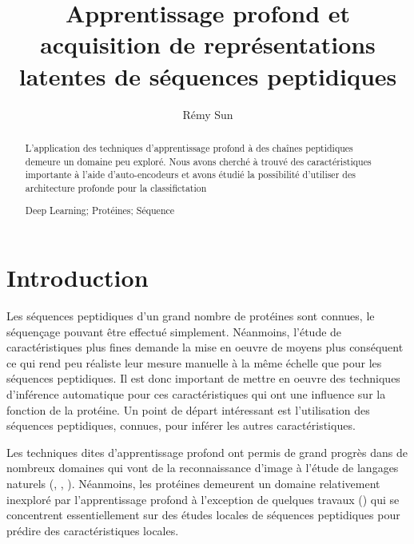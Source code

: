 \documentclass[a4paper, 11pt, onecolumn]{article}
\title{Apprentissage profond et acquisition de représentations latentes de séquences peptidiques}
\author{Rémy Sun}
\newenvironment{keywords}%
{\description\item[Mots-clés.]}%
{\enddescription}
\begin{document}
\maketitle

\begin{abstract}
  L'application des techniques d'apprentissage profond à des chaînes peptidiques
  demeure un domaine peu exploré. Nous avons cherché à trouvé des
  caractéristiques importante à l'aide d'auto-encodeurs et avons étudié la
  possibilité d'utiliser des architecture profonde pour la classifictation
  \begin{keywords}
    Deep Learning; Protéines; Séquence
  \end{keywords}
\end{abstract}

\section*{Introduction}


Les séquences peptidiques d'un grand nombre de protéines sont connues, le
séquençage pouvant être effectué simplement. Néanmoins, l'étude de caractéristiques plus
fines demande la mise en oeuvre de moyens plus conséquent ce qui rend peu
réaliste leur mesure manuelle à la même échelle que pour les séquences
peptidiques. Il est donc important de mettre en oeuvre des techniques
d'inférence automatique pour ces caractéristiques qui ont une influence sur la
fonction de la protéine. Un point de départ intéressant est l'utilisation des
séquences peptidiques, connues, pour inférer les autres caractéristiques.

Les techniques dites d'apprentissage profond ont permis de grand progrès dans de
nombreux domaines qui vont de la reconnaissance d'image à l'étude de langages
naturels (\cite{DBLP:journals/corr/ChoMGBSB14}, \cite{socher2011semi}, \cite{NIPS2014_5346}). Néanmoins, les
protéines demeurent un domaine relativement inexploré par l'apprentissage
profond à l'exception de quelques travaux
(\cite{Spencer:2015:DLN:2817095.2817106}) qui se concentrent essentiellement sur
des études locales de séquences peptidiques pour prédire des caractéristiques locales.
\end{document}
